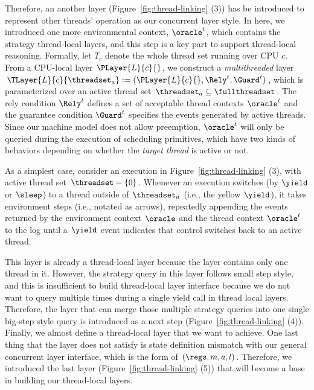 Therefore, an another layer (Figure~\ref{fig:thread-linking} (3)) has be introduced to represent other 
threads' operation as our concurrent layer style. 
In here, we introduced one more environmental context, $\oracle^{t}$, which contains the strategy thread-local layers, and this step is a key part to support  thread-local reasoning.
Formally, let $T_c$ denote the whole thread set running over CPU $c$.
From a CPU-local layer  $\PLayer{L}{c}{}$,  we construct a 
 \emph{multithreaded} layer $\TLayer{L}{c}{\threadset_a} := (\PLayer{L}{c}{},
 \Rely^t, \Guard^t)$,
which is 
parameterized over an active thread set $\threadset_a \subseteq \fullthreadset$.
The rely condition $\Rely^t$ defines a set of acceptable thread contexts
$\oracle^t$ and the guarantee condition $\Guard^t$ specifies the events generated by active threads. 
Since our machine model does not allow
preemption, $\oracle^t$ will only be queried during the execution of scheduling primitives, 
which have two kinds
of behaviors  depending on whether the \emph{target
thread} is active or not.
As a simplest case, consider an execution in Figure~\ref{fig:thread-linking} (3), with active thread set
$\threadset = \{0\}$. Whenever an execution switches (by $\yield$ or $\sleep$) 
to a thread outside of $\threadset_a$ (i.e., the yellow $\yield$),
it takes environment steps (i.e., notated as arrows), repeatedly appending the 
events returned by the environment context $\oracle$ and the thread
context $\oracle^t$ to the log until a $\yield$
event indicates that control switches back to an active thread.


This layer is already a thread-local layer because the layer contains only one thread in it.
However, the strategy query in this layer follows small step style, and this is insufficient to build thread-local layer interface because we do not want to query multiple times during a single yield call in thread local layers. 
Therefore, the layer that can merge those multiple strategy queries into one single big-step style query is introduced as a next step (Figure~\ref{fig:thread-linking} (4)). 
Finally, we almost define a thread-local layer that we want to achieve. 
One last thing that the layer does not satisfy is state definition mismatch with our general concurrent layer interface, which is the form of $(\regs, m, a, l)$.
Therefore, we introduced the last layer (Figure~\ref{fig:thread-linking} (5)) that will become a base in building our thread-local layers.


